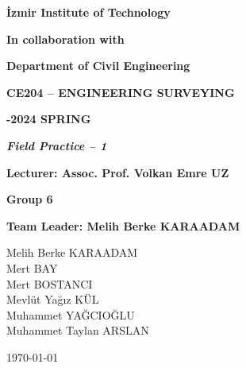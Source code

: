 \documentclass[12pt]{article}
\author{Muhammet Yağcıoğlu - 290204042}
\begin{document}
\onecolumn

\begin{center}
\bigskip
\bigskip
\textbf{\fontsize{14}{\baselineskip}\selectfont İzmir Institute of Technology}

\bigskip

\textbf{\fontsize{14}{\baselineskip}\selectfont In collaboration with}

\bigskip

\textbf{\fontsize{14}{\baselineskip}\selectfont Department of Civil Engineering}

\bigskip



\bigskip

\textbf{\fontsize{16}{\baselineskip}\selectfont CE204 – ENGINEERING
SURVEYING}

\bigskip

\textbf{\fontsize{16}{\baselineskip}-2024 SPRING}

\bigskip

\bigskip

\bigskip

\textit{\textbf{\fontsize{14}{\baselineskip}\selectfont Field Practice – 1}}

\bigskip

\bigskip

\bigskip

\textbf{\fontsize{14}{\baselineskip}\selectfont Lecturer: Assoc. Prof. Volkan Emre UZ }

\bigskip

\textbf{\fontsize{14}{\baselineskip}\selectfont Group 6}

\bigskip

\textbf{\fontsize{14}{\baselineskip}\selectfont Team Leader: Melih Berke	KARAADAM}

\bigskip

Melih Berke	KARAADAM\\
Mert BAY\\
Mert BOSTANCI \\
Mevlüt Yağız KÜL\\
Muhammet YAĞCIOĞLU\\
Muhammet Taylan ARSLAN\\


\bigskip

\bigskip

\bigskip

{\today}
\end{center}
\end{document}
